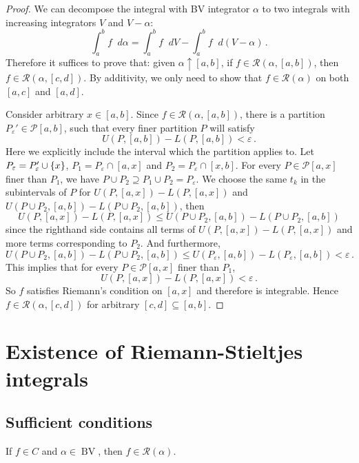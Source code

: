 \documentclass{article}
\newcommand{\Riemann}{\mathcal R}
\newcommand{\Partition}{\mathcal P}
\DeclarePairedDelimiter\set{\lbrace}{\rbrace}
\newcommand{\finer}{\supseteq}
\newcommand{\dd}{\mathop{}\!d}
\newcommand{\increasing}{\uparrow}
\DeclareMathOperator{\BV}{BV}
\begin{document}
\begin{proof}
    We can decompose the integral with BV integrator $ \alpha $ to two integrals with increasing integrators $ V $ and $ V - \alpha $:
    \[ 
        \int_a^b f \dd \alpha = \int_a^b f \dd V - \int_a^b f \dd (V - \alpha) \,.
    \]
    Therefore it suffices to prove that: given $ \alpha \increasing [a, b] $, if $ f \in \Riemann(\alpha, [a, b]) $, then $ f \in \Riemann(\alpha, [c, d]) $. By additivity, we only need to show that $ f \in \Riemann(\alpha) $ on both $ [a, c] $ and $ [a, d] $.

    Consider arbitrary $ x \in [a, b] $. Since $ f \in \Riemann(\alpha, [a, b]) $, there is a partition $ P_\varepsilon' \in \Partition[a, b] $, such that every finer partition $ P $ will satisfy
    \[ 
        U(P, [a, b]) - L(P, [a, b]) < \varepsilon \,.
    \]
    Here we explicitly include the interval which the partition applies to.
    Let $ P_\varepsilon = P_\varepsilon' \cup \set{x} $, $ P_1 = P_\varepsilon \cap [a, x] $ and $ P_2 = P_\varepsilon \cap [x, b] $. For every $ P \in \Partition[a, x] $ finer than $ P_1 $, we have $ P \cup P_2 \finer P_1 \cup P_2 = P_\varepsilon $. We choose the same $ t_k $ in the subintervals of $ P $ for $ U(P, [a, x]) - L(P, [a, x]) $ and $ U(P \cup P_2, [a, b]) - L(P \cup P_2, [a, b]) $, then
    \[ 
        U(P, [a, x]) - L(P, [a, x]) \leqslant U(P \cup P_2, [a, b]) - L(P \cup P_2, [a, b])
    \]
    since the righthand side contains all terms of $ U(P, [a, x]) - L(P, [a, x]) $ and more terms corresponding to $ P_2 $. And furthermore,
    \[ 
        U(P \cup P_2, [a, b]) - L(P \cup P_2, [a, b]) \leqslant U(P_\varepsilon, [a, b]) - L(P_\varepsilon, [a, b]) < \varepsilon \,.
    \]
    This implies that for every $ P \in \Partition[a, x] $ finer than $ P_1 $,
    \[ 
        U(P, [a, x]) - L(P, [a, x]) < \varepsilon \,.
    \]
    So $ f $ satisfies Riemann's condition on $ [a, x] $ and therefore is integrable. Hence $ f \in \Riemann(\alpha, [c, d]) $ for arbitrary $ [c, d] \subseteq [a, b] $.
\end{proof}

\section{Existence of Riemann-Stieltjes integrals}
\subsection{Sufficient conditions}
\begin{theorem}
    If $ f \in C $ and $ \alpha \in \BV $, then $ f \in \Riemann(\alpha) $.
\end{theorem}
\end{document}
